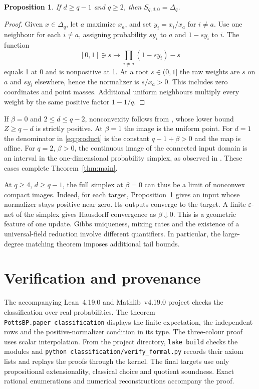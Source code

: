 \documentclass[11pt,reqno]{amsart}
\newtheorem{proposition}[theorem]{Proposition}
\begin{document}
\begin{proposition}\label{prop:zero}
If $d\ge q-1$ and $q\ge2$, then $S_{q,d,0}=\Delta_q$.
\end{proposition}
\begin{proof}
Given $x\in\Delta_q$, let $a$ maximize $x_a$, and set $y_i=x_i/x_a$ for $i\ne a$. Use one neighbour for each $i\ne a$, assigning probability $s y_i$ to $a$ and $1-s y_i$ to $i$. The function
\[
 [0,1]\ni s\longmapsto \prod_{i\ne a}(1-s y_i)-s
\]
equals 1 at 0 and is nonpositive at 1. At a root $s\in(0,1]$ the raw weights are $s$ on $a$ and $s y_i$ elsewhere, hence the normalizer is $s/x_a>0$. This includes zero coordinates and point masses. Additional uniform neighbours multiply every weight by the same positive factor $1-1/q$.
\end{proof}

If $\beta=0$ and $2\le d\le q-2$, nonconvexity follows from \cite[Theorem~1]{Short}, whose lower bound $Z\ge q-d$ is strictly positive. At $\beta=1$ the image is the uniform point. For $d=1$ the denominator in \eqref{eq:product} is the constant $q-1+\beta>0$ and the map is affine. For $q=2$, $\beta>0$, the continuous image of the connected input domain is an interval in the one-dimensional probability simplex, as observed in \cite[\S4]{LMP}. These cases complete Theorem~\ref{thm:main}.

At $q\ge4$, $d\ge q-1$, the full simplex at $\beta=0$ can thus be a limit of nonconvex compact images. Indeed, for each target, Proposition~\ref{prop:zero} gives an input whose normalizer stays positive near zero. Its outputs converge to the target. A finite $\varepsilon$-net of the simplex gives Hausdorff convergence as $\beta\downarrow0$. This is a geometric feature of one update. Gibbs uniqueness, mixing rates and the existence of a universal-field reduction involve different quantifiers. In particular, the large-degree matching theorem \cite[Theorem~1.4]{LMP} imposes additional tail bounds.

\section{Verification and provenance}

The accompanying Lean~4.19.0 and Mathlib~v4.19.0 project checks the classification over real probabilities. The theorem \texttt{PottsBP.paper\_classification} displays the finite expectation, the independent rows and the positive-normalizer condition in its type. The three-colour proof uses scalar interpolation. From the project directory, \texttt{lake build} checks the modules and \texttt{python classification/verify\_formal.py} records their axiom lists and replays the proofs through the kernel. The final targets use only propositional extensionality, classical choice and quotient soundness. Exact rational enumerations and numerical reconstructions accompany the proof.
\end{document}
